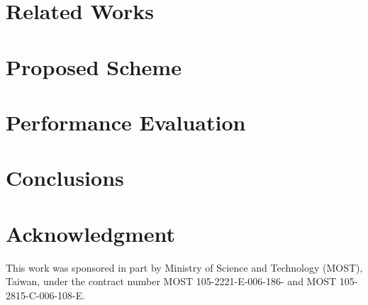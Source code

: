\documentclass[10pt, conference, compsocconf]{IEEEtran}
\begin{document}
\section{Related Works} \label{ch:2-background}
	

\section{Proposed Scheme} \label{ch:3-proposed}
	
	
\section{Performance Evaluation} \label{ch:5-performance}
	
	
\section{Conclusions} \label{ch:6-conclusion}
	

\section*{Acknowledgment}
This work was sponsored in part by Ministry of Science and Technology (MOST), Taiwan, under the contract number MOST 105-2221-E-006-186- and MOST 105-2815-C-006-108-E. 


	
	
\end{document}
